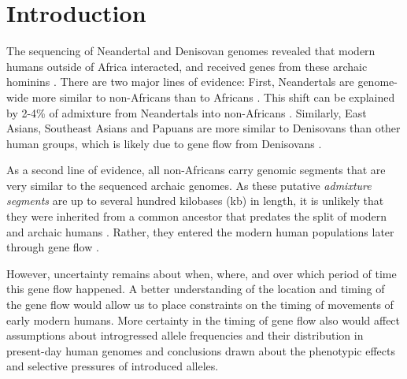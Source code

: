 \documentclass[11pt]{article}
\let\oldparagraph\paragraph
\renewcommand{\paragraph}[1]{\oldparagraph{#1}\mbox{}}
\begin{document}
\section{Introduction}\label{introduction}

The sequencing of Neandertal  \citep{green_draft_2010,prufer_complete_2013,prufer_high-coverage_2017, mafessoni_high_coverage_2020} and Denisovan genomes \citep{reich_genetic_2010, meyer_high-coverage_2012} revealed that modern humans outside of Africa interacted, and received genes from these archaic hominins \citep{vernot_resurrecting_2014,fu_genome_2014,sankararaman_genomic_2014,fu_early_2015,malaspinas_genomic_2016,sankararaman_combined_2016,vernot_excavating_2016}. There are two major lines of evidence: First, Neandertals are genome-wide more similar to non-Africans than to Africans \citep{green_draft_2010}. This shift can be explained by 2-4\% of admixture from Neandertals into non-Africans \citep{green_draft_2010, prufer_complete_2013}. Similarly, East Asians, Southeast Asians and Papuans are more similar to Denisovans than other human groups, which is likely due to gene flow from Denisovans \citep{meyer_high-coverage_2012}. 

As a second line of evidence, all non-Africans carry genomic segments that are very similar to the sequenced archaic genomes. As these putative \emph{admixture segments} are up to several hundred kilobases (kb) in length, it is unlikely that they were inherited from a common ancestor that predates the split of modern and archaic humans \citep{sankararaman_genomic_2014, vernot_resurrecting_2014}. Rather, they entered the modern human populations later through gene flow \citep{sankararaman_date_2012,sankararaman_genomic_2014, vernot_resurrecting_2014, sankararaman_combined_2016,vernot_excavating_2016}. 


However, uncertainty remains about when, where, and over which period of time this gene flow happened. A better understanding of  the location and timing of the gene flow would allow us to place  constraints on the timing of movements of early modern humans. More certainty in the timing of gene flow also would affect  assumptions about introgressed allele frequencies and their distribution in present-day human genomes and conclusions drawn about the phenotypic effects and selective pressures of introduced alleles.
\end{document}
